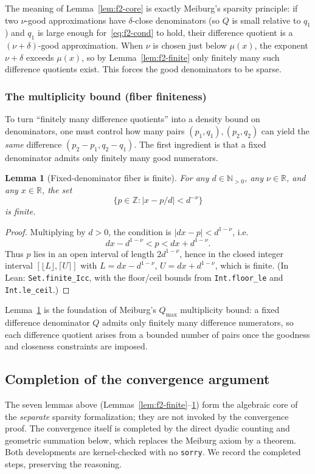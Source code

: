 \documentclass[11pt]{amsart}
\newtheorem{lemma}[theorem]{Lemma}
\theoremstyle{definition}
\theoremstyle{remark}
\numberwithin{equation}{section}
\newcommand{\R}{\mathbb{R}}
\newcommand{\Z}{\mathbb{Z}}
\newcommand{\N}{\mathbb{N}}
\newcommand{\irr}{\mu}
\begin{document}
The meaning of Lemma~\ref{lem:f2-core} is exactly Meiburg's sparsity principle: if two $\nu$-good approximations have $\delta$-close denominators (so $Q$ is small relative to $q_1$) and $q_1$ is large enough for~\eqref{eq:f2-cond} to hold, their difference quotient is a $(\nu+\delta)$-good approximation. When $\nu$ is chosen just below $\irr(x)$, the exponent $\nu+\delta$ exceeds $\irr(x)$, so by Lemma~\ref{lem:f2-finite} only finitely many such difference quotients exist. This forces the good denominators to be sparse.

\subsubsection{The multiplicity bound (fiber finiteness)}

To turn ``finitely many difference quotients'' into a density bound on denominators, one must control how many pairs $(p_1,q_1),(p_2,q_2)$ can yield the \emph{same} difference $(p_2-p_1,q_2-q_1)$. The first ingredient is that a fixed denominator admits only finitely many good numerators.

\begin{lemma}[Fixed-denominator fiber is finite]\label{lem:f2-fiber}
For any $d\in\N_{>0}$, any $\nu\in\R$, and any $x\in\R$, the set
\[
\{p\in\Z:|x-p/d|<d^{-\nu}\}
\]
is finite.
\end{lemma}
\begin{proof}
Multiplying by $d>0$, the condition is $|dx-p|<d^{1-\nu}$, i.e.
\[
dx-d^{1-\nu}<p<dx+d^{1-\nu}.
\]
Thus $p$ lies in an open interval of length $2d^{1-\nu}$, hence in the closed integer interval $[\lfloor L\rfloor,\lceil U\rceil]$ with $L=dx-d^{1-\nu}$, $U=dx+d^{1-\nu}$, which is finite. (In Lean: \texttt{Set.finite\_Icc}, with the floor/ceil bounds from \texttt{Int.floor\_le} and \texttt{Int.le\_ceil}.)
\end{proof}

Lemma~\ref{lem:f2-fiber} is the foundation of Meiburg's $Q_{\max}$ multiplicity bound: a fixed difference denominator $Q$ admits only finitely many difference numerators, so each difference quotient arises from a bounded number of pairs once the goodness and closeness constraints are imposed.

\subsection{Completion of the convergence argument}\label{sec:lean-f2-remaining}

The seven lemmas above (Lemmas~\ref{lem:f2-finite}--\ref{lem:f2-fiber}) form the algebraic core of the \emph{separate} sparsity formalization; they are not invoked by the convergence proof. The convergence itself is completed by the direct dyadic counting and geometric summation below, which replaces the Meiburg axiom by a theorem. Both developments are kernel-checked with no \texttt{sorry}. We record the completed steps, preserving the reasoning.
\end{document}
